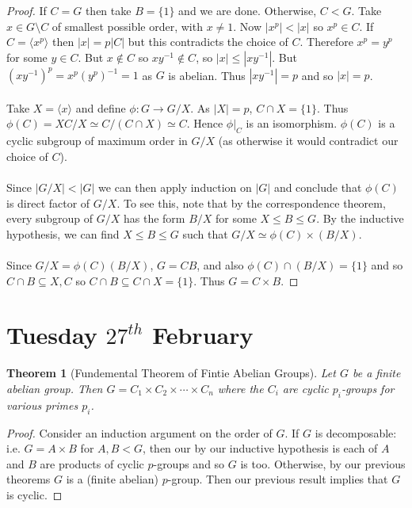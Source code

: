 \documentclass[a4paper,10pt]{article}
\newtheorem{thm}{Theorem}
\begin{document}
\begin{proof}
If $C = G$ then take $B = \{1\}$ and we are done. Otherwise, $C < G$. Take $x \in G \setminus C$ of smallest possible order, with $x \neq 1$. Now $|x^p| < |x|$ so $x^p \in C$. If $C = \langle x^p \rangle $ then $|x| = p|C|$ but this contradicts the choice of $C$. Therefore $x^p = y^p$ for some $y \in C$. But $x \notin C$ so $xy^{-1} \notin C$, so $|x| \leq |xy^{-1}|$. But $(xy^{-1})^p = x^p (y^p)^{-1} = 1$ as $G$ is abelian. Thus $|xy^{-1}| = p$ and so $|x| = p$. \\
\\
Take $X = \langle x \rangle$ and define $\phi : G \rightarrow G / X$. As $|X| = p$, $C \cap X = \{1\}$. Thus $\phi(C) = XC / X \simeq C / (C \cap X) \simeq C$. Hence $\phi |_C$ is an isomorphism. $\phi(C)$ is a cyclic subgroup of maximum order in $G / X$ (as otherwise it would contradict our choice of $C$). \\
\\
Since $|G / X| < |G|$ we can then apply induction on $|G|$ and conclude that $\phi(C)$ is direct factor of $G / X$. To see this, note that by the correspondence theorem, every subgroup of $G / X$ has the form $B / X$ for some $X \leq B \leq G$. By the inductive hypothesis, we can find $X \leq B \leq G$ such that $G / X \simeq \phi(C) \times (B / X)$. \\
\\
Since $G / X = \phi(C) (B / X)$, $G  = CB$, and also $\phi(C) \cap (B/X) = \{1\}$ and so $C \cap B \subseteq X, C$ so $C \cap B \subseteq C \cap X = \{ 1 \}$. Thus $G = C \times B$.  
\end{proof}



\newpage
\section{Tuesday $27^{th}$ February}

\begin{thm}[Fundemental Theorem of Fintie Abelian Groups]
Let $G$ be a finite abelian group. Then $G = C_1 \times C_2 \times \cdots \times  C_n$ where the $C_i$ are cyclic $p_i$-groups for various primes $p_i$. 
\end{thm}

\begin{proof}
Consider an induction argument on the order of $G$. If $G$ is decomposable: i.e. $G = A \times B$ for $A,B < G$, then our by our inductive hypothesis is each of $A$ and $B$ are products of cyclic $p$-groups and so $G$ is too. Otherwise, by our previous theorems $G$ is a (finite abelian) $p$-group. Then our previous result implies that $G$ is cyclic.
\end{proof}
\end{document}
